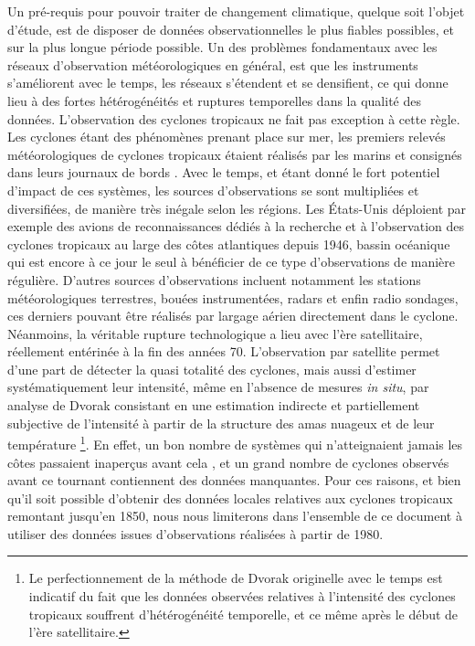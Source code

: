 \documentclass[../main.tex]{subfiles}
\begin{document}
Un pré-requis pour pouvoir traiter de changement climatique, quelque soit l'objet d'étude, est de disposer de données observationnelles le plus fiables possibles, et sur la plus longue période possible. Un des problèmes fondamentaux avec les réseaux d'observation météorologiques en général, est que les instruments s'améliorent avec le temps, les réseaux s'étendent et se densifient, ce qui donne lieu à
des fortes hétérogénéités et ruptures temporelles dans la qualité des données. L'observation des cyclones tropicaux ne fait pas exception à cette règle. Les cyclones étant des phénomènes prenant place sur mer, les premiers relevés météorologiques de cyclones tropicaux étaient réalisés par les marins et consignés dans leurs journaux de bords \parencite{knapp_international_2010}. Avec le temps, et étant donné le fort potentiel d'impact de ces systèmes, les sources d'observations se sont
multipliées et diversifiées, de manière très inégale selon les régions. Les États-Unis déploient par exemple des avions de reconnaissances dédiés à la recherche et à l'observation des cyclones tropicaux au large des côtes atlantiques depuis \num{1946}, bassin océanique qui est encore à ce jour le seul à bénéficier de ce type d'observations de manière régulière. D'autres sources d'observations incluent notamment les stations météorologiques terrestres, bouées instrumentées, radars et
enfin radio
sondages, ces derniers pouvant être réalisés par largage aérien directement dans le cyclone. Néanmoins, la véritable rupture technologique a lieu avec l'ère satellitaire, réellement entérinée à la fin des années 70. L'observation par satellite permet d'une part de détecter la quasi totalité des cyclones, mais aussi d'estimer systématiquement leur intensité, même en l'absence de mesures \textit{in situ}, par analyse de Dvorak consistant en
une estimation indirecte et partiellement subjective de l'intensité à partir de la structure des amas nuageux et de leur température \parencite{dvorak_tropical_1975,velden_development_1998,olander_development_2002,olander_advanced_2007,olander_advanced_2019}\footnote{Le perfectionnement de la méthode de Dvorak originelle avec le temps est indicatif du fait que les données observées relatives à l'intensité des cyclones tropicaux souffrent d'hétérogénéité temporelle, et ce même après le début de l'ère
satellitaire.}. En effet, un bon nombre de systèmes qui n'atteignaient jamais les côtes
passaient inaperçus avant cela \parencite{landsea_atlantic_2004}, et un grand nombre de cyclones observés avant ce tournant contiennent des données manquantes. Pour ces raisons,
et bien qu'il soit possible d'obtenir des données locales relatives aux cyclones tropicaux remontant jusqu'en \num{1850}, nous nous limiterons dans l'ensemble de ce document à utiliser des données issues d'observations réalisées à partir de \num{1980}.
\end{document}

